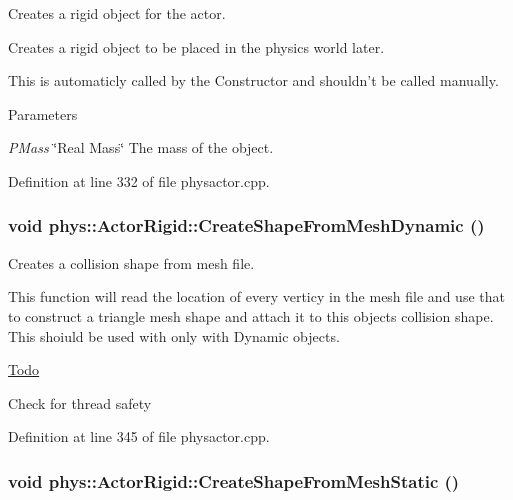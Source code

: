 Creates a rigid object for the actor. 

Creates a rigid object to be placed in the physics world later. \par
 This is automaticly called by the Constructor and shouldn't be called manually. 
\begin{DoxyParams}{Parameters}
\item[{\em PMass}]\char`\"{}Real Mass\char`\"{} The mass of the object. \end{DoxyParams}


Definition at line 332 of file physactor.cpp.

\hypertarget{classphys_1_1ActorRigid_a067d5beab7602bbc3de852b9b8332113}{
\subsubsection[{CreateShapeFromMeshDynamic}]{\setlength{\rightskip}{0pt plus 5cm}void phys::ActorRigid::CreateShapeFromMeshDynamic ()}}
\label{d8/d71/classphys_1_1ActorRigid_a067d5beab7602bbc3de852b9b8332113}


Creates a collision shape from mesh file. 

This function will read the location of every verticy in the mesh file and use that to construct a triangle mesh shape and attach it to this objects collision shape. This shoiuld be used with only with Dynamic objects. 

\begin{Desc}
\item[\hyperlink{todo__todo000010}{Todo}]
\begin{DoxyItemize}
\item Check for thread safety 
\end{DoxyItemize}\end{Desc}




Definition at line 345 of file physactor.cpp.

\hypertarget{classphys_1_1ActorRigid_a84554dcaaf2475ba0ec7dcb9235050ac}{
\subsubsection[{CreateShapeFromMeshStatic}]{\setlength{\rightskip}{0pt plus 5cm}void phys::ActorRigid::CreateShapeFromMeshStatic ()}}
\label{d8/d71/classphys_1_1ActorRigid_a84554dcaaf2475ba0ec7dcb9235050ac}



